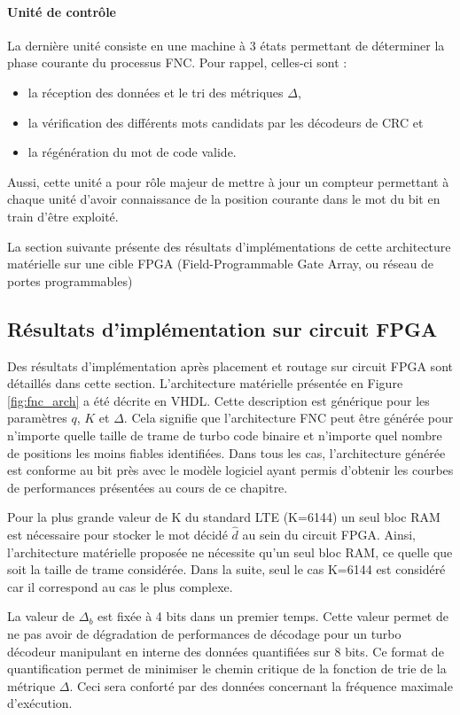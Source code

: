 \paragraph*{Unité de contrôle} La dernière unité consiste en  une machine à 3 états permettant de 
déterminer la phase courante du processus FNC. Pour rappel, celles-ci sont : 
\begin{itemize}
	\item la réception des données et le tri des métriques $\Delta$,
	\item la vérification des différents mots candidats par les décodeurs de CRC et
	\item la régénération du mot de code valide.
\end{itemize}
Aussi, 
cette unité a pour rôle majeur de mettre à jour un compteur permettant à chaque unité d'avoir connaissance de la position 
courante dans 
le mot du bit en train d'être exploité.

La section suivante présente des résultats d'implémentations de cette architecture matérielle sur une cible FPGA 
(Field-Programmable Gate Array, ou réseau de portes programmables)

\subsection{Résultats d'implémentation sur circuit FPGA}
Des résultats d'implémentation après placement et routage sur circuit FPGA sont détaillés dans cette section. L'architecture 
matérielle  présentée en Figure \ref{fig:fnc_arch} a été décrite en VHDL. 
Cette description est générique pour les paramètres $q$, $K$ et $\Delta$. Cela signifie que l'architecture FNC peut être générée pour n'importe 
quelle taille de trame de turbo code binaire et n'importe quel nombre de positions les moins fiables identifiées. Dans
tous les cas, 
l'architecture générée est conforme au bit près avec le modèle logiciel ayant permis d'obtenir les courbes de 
performances présentées au cours de ce chapitre.

Pour la plus grande valeur de K du standard LTE (K=6144) un seul bloc RAM est nécessaire pour stocker le mot décidé $\hat{d}$ 
au sein du circuit FPGA. Ainsi, 
l'architecture matérielle proposée ne nécessite qu'un seul bloc RAM, ce quelle que soit la taille de trame considérée. Dans la 
suite, seul le cas K=6144 est considéré car il correspond au cas le plus complexe.

La valeur de $\Delta_b$ est fixée à 4 bits dans un premier temps. Cette valeur permet de ne pas avoir de dégradation de 
performances de décodage pour un turbo décodeur manipulant en interne des données quantifiées sur 8 bits. Ce format 
de quantification permet de minimiser le chemin critique de la fonction de trie de la métrique $\Delta$. Ceci sera conforté par des données concernant la fréquence maximale d'exécution.

